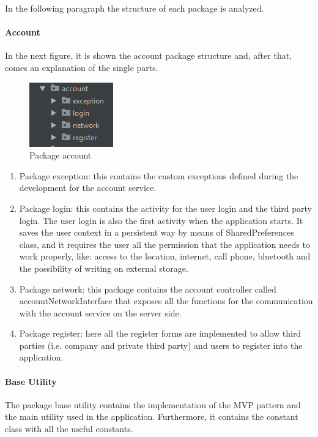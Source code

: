 In the following paragraph the structure of each package is analyzed.

\paragraph{Account}
In the next figure, it is shown the account package structure and, after that, comes an explanation of the single parts.
  
\begin{figure}[H]
\includegraphics[width=0.6\linewidth ]{images/PackageAccount.png}
\centering
\caption{ Package account}
\label{fig:pkgsharedata}
\end{figure}

\begin{enumerate}
\item Package exception: this contains the custom exceptions defined during the development for the account service.
\item Package login: this contains the activity for the user login and the third party login. 
The user login is also the first activity when the application starts. 
It saves the user context in a persistent way by means of SharedPreferences class, and it requires the user all the permission that the
application needs to work properly, like: access to the location, internet, call phone, bluetooth and the possibility of writing on external
storage.
\item Package network: this package contains the account controller called accountNetworkInterface that exposes all the functions for the
communication with the account service on the server side.
\item Package register: here all the register forms are implemented to allow third parties (i.e. company and private third party) and
users to register into the application. 
\end{enumerate}

\paragraph{Base Utility}
The package base utility contains the implementation of the MVP pattern and the main utility used in the application. 
Furthermore, it contains the constant class with all the useful constants.

